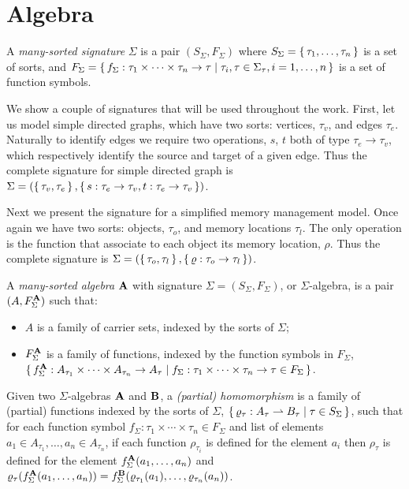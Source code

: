 \section{Algebra}\label{sec:algebra}

\begin{definition}
  A \emph{many-sorted signature} $\Sigma$ is a pair $(S_\Sigma, F_\Sigma)$ where $S_\Sigma = \set{\tau_1, \ldots,
  \tau_n}$ is a set of sorts, and $F_\Sigma = \set{f_\Sigma : \tau_1 \times \cdots \times \tau_n \to \tau | \tau_i, \tau
  \in \Sigma_\tau, i = 1, \ldots, n}$ is a set of function symbols.
\end{definition}

We show a couple of signatures that will be used throughout the work. First, let us model simple directed graphs, which
have two sorts: vertices, $\tau_v$, and edges $\tau_e$. Naturally to identify edges we require two operations, $s$, $t$
both of type $\tau_e \to \tau_v$, which respectively identify the source and target of a given edge. Thus the complete
signature for simple directed graph is $\Sigma = (\set{\tau_v, \tau_e}, \set{s : \tau_e \to \tau_v, t : \tau_e \to
\tau_v})$.

Next we present the signature for a simplified memory management model. Once again we have two sorts: objects, $\tau_o$, and
memory locations $\tau_l$. The only operation is the function that associate to each object its memory location,
$\rho$. Thus the complete signature is $\Sigma = (\set{\tau_o, \tau_l}, \set{\varrho: \tau_o \to \tau_l})$.

\begin{definition}
  A \emph{many-sorted algebra} $\mathbf{A}$ with signature $\Sigma = (S_\Sigma, F_\Sigma)$, or $\Sigma$-algebra, is a
  pair $(A, F_\Sigma^{\mathbf{A}})$ such that:
  \begin{itemize}
    \item $A$ is a family of carrier sets, indexed by the sorts of $\Sigma$;
    \item $F_\Sigma^{\mathbf{A}}$ is a family of functions, indexed by the function symbols in $F_\Sigma$,
      $\set{f_\Sigma^{\mathbf{A}} : A_{\tau_1} \times \cdots \times A_{\tau_n} \to A_\tau | f_\Sigma : \tau_1 \times
      \cdots \times \tau_n \to \tau \in F_\Sigma}$.
  \end{itemize}
\end{definition}

\begin{definition}[Homomorphism]
  Given two $\Sigma$-algebras $\mathbf{A}$ and $\mathbf{B}$, a \emph{(partial)
  homomorphism} is a family of (partial) functions indexed by the sorts of $\Sigma$, $\set{\varrho_\tau : A_\tau
  \rightharpoonup B_\tau | \tau \in S_\Sigma}$, such that for each function symbol $f_\Sigma : \tau_1 \times \cdots \times
  \tau_n \in F_\Sigma$ and list of elements $a_1 \in A_{\tau_1}, \ldots, a_n \in A_{\tau_n}$, if each function
  $\rho_{\tau_i}$ is defined for the element $a_i$ then $\rho_\tau$ is defined for the element $f_\Sigma^{\mathbf{A}}(a_1,
  \ldots, a_n)$ and $\varrho_\tau(f_\Sigma^{\mathbf{A}}(a_1, \ldots, a_n)) = f_\Sigma^{\mathbf{B}}(\varrho_{\tau_1}(a_1),
  \ldots, \varrho_{\tau_n}(a_n))$.
\end{definition}

